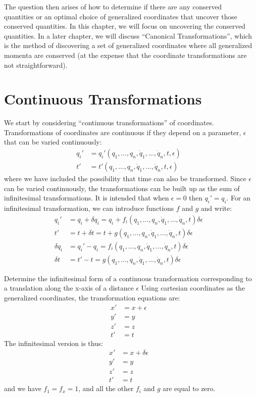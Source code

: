 The question then arises of how to determine if there are any conserved quantities or an optimal choice of generalized coordinates that uncover those conserved quantities. In this chapter, we will focus on uncovering the conserved quantities. In a later chapter, we will discuss ``Canonical Transformations'', which is the method of discovering a set of generalized coordinates where all generalized momenta are conserved (at the expense that the coordinate transformations are not straightforward).

\section{Continuous Transformations}
We start by considering ``continuous transformations'' of coordinates. Transformations of coordinates are continuous if they depend on a parameter, $\epsilon$ that can be varied continuously:
\begin{align}
q_i'&=q_i'(q_1,\dots ,q_n,\dot{q}_1,\dots ,\dot{q}_n, t, \epsilon)\nonumber\\
t'&=t'(q_1,\dots ,q_n,\dot{q}_1,\dots ,\dot{q}_n, t, \epsilon)
\end{align}
where we have included the possibility that time can also be transformed. Since $\epsilon$ can be varied continuously, the transformations can be built up as the sum of infinitesimal transformations. It is intended that when $\epsilon=0$ then $q_i'=q_i$. For an infinitesimal transformation, we can introduce functions $f$ and $g$ and write:
\begin{align}
q_i'&=q_i+\delta q_i=q_i+f_i(q_1,\dots ,q_n,\dot{q}_1,\dots ,\dot{q}_n, t)\delta\epsilon\nonumber\\
t'&=t+\delta t=t+g(q_1,\dots ,q_n,\dot{q}_1,\dots ,\dot{q}_n, t)\delta\epsilon\nonumber\\
\delta q_i&=q_i'-q_i=f_i(q_1,\dots ,q_n,\dot{q}_1,\dots ,\dot{q}_n, t)\delta\epsilon\nonumber\\
\delta t&=t'-t=g(q_1,\dots ,q_n,\dot{q}_1,\dots ,\dot{q}_n, t)\delta\epsilon
\end{align}
\begin{example}{0pt}{Determine the infinitesimal form of a continuous transformation corresponding to a translation along the x-axis of a distance $\epsilon$}{}
Using cartesian coordinates as the generalized coordinates, the transformation equations are:
\begin{align*}
x'&=x+\epsilon\\
y'&=y\\
z'&=z\\
t'&=t
\end{align*}
The infinitesimal version is thus:
\begin{align*}
x'&=x+\delta\epsilon\\
y'&=y\\
z'&=z\\
t'&=t
\end{align*}
and we have $f_1=f_x=1$, and all the other $f_i$ and $g$ are equal to zero.
\end{example}

